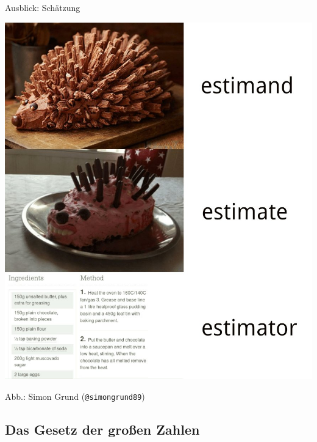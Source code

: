 \documentclass[
  10pt,
  ignorenonframetext,
]{beamer}
\begin{document}
\begin{frame}[fragile]{Ausblick: Schätzung}
\label{ausblick-schuxe4tzung-2}
\centering

\includegraphics[width=\textwidth,height=0.8\textheight]{pics/estimate-estimator.jpeg}

\raggedright
\tiny

Abb.: Simon Grund (\texttt{@simongrund89})
\end{frame}

\subsection{Das Gesetz der großen
Zahlen}\label{das-gesetz-der-grouxdfen-zahlen}
\end{document}
